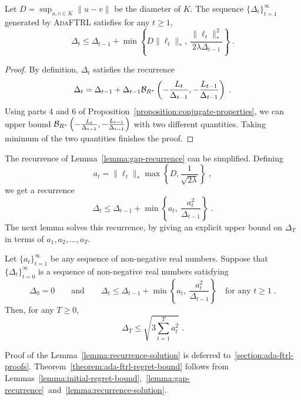 \begin{lemma}[Recurrence]
\label{lemma:gap-recurrence}
Let $D = \sup_{u, v \in K} \|u -v\|$ be the diameter of $K$.  The sequence
$\{\Delta_t\}_{t=1}^\infty$ generated by \textsc{AdaFTRL} satisfies for any $t
\ge 1$,
$$
\Delta_t \le \Delta_{t-1} + \min \left\{ D\|\ell_t\|_*, \ \frac{\|\ell_t\|_*^2}{2\lambda \Delta_{t-1}} \right\} \; .
$$
\end{lemma}

\begin{proof}
By definition, $\Delta_t$ satisfies the recurrence
$$
\Delta_t = \Delta_{t-1} + \Delta_{t-1} \mathcal{B}_{R^*}\left( - \frac{L_t}{\Delta_{t-1}}, - \frac{L_{t-1}}{\Delta_{t-1}} \right) \; .
$$
Using parts 4 and 6 of Proposition~\ref{proposition:conjugate-properties}, we
can upper bound $\mathcal{B}_{R^*}\left( - \frac{L_t}{\Delta_{t-1}}, -
\frac{L_{t-1}}{\Delta_{t-1}} \right)$ with two different quantities.  Taking
minimum of the two quantities finishes the proof.
\end{proof}

The recurrence of Lemma~\ref{lemma:gap-recurrence} can be simplified. Defining
$$
a_t = \|\ell_t\|_* \max \left\{D, \frac{1}{\sqrt{2 \lambda}} \right\} \; ,
$$
we get a recurrence
$$
\Delta_t \le \Delta_{t-1} + \min \left\{ a_t, \ \frac{a_t^2}{\Delta_{t-1}} \right\} \; .
$$
The next lemma solves this recurrence, by giving an explicit upper bound on
$\Delta_T$ in terms of $a_1, a_2, \dots, a_T$.

\begin{lemma}
\label{lemma:recurrence-solution}
Let $\{a_t\}_{t=1}^\infty$ be any sequence of non-negative real numbers.
Suppose that $\{\Delta_t\}_{t=0}^\infty$ is a sequence of non-negative real
numbers satisfying
$$
\Delta_0 = 0 \qquad \text{and} \qquad
\Delta_t \le \Delta_{t-1} + \min \left\{ a_t, \ \frac{a_t^2}{\Delta_{t-1}} \right\} \quad \text{for any $t \ge 1$} \; .
$$
Then, for any $T \ge 0$,
$$
\Delta_T \le \sqrt{3 \sum_{t=1}^T a_t^2} \; .
$$
\end{lemma}
%
Proof of the Lemma~\ref{lemma:recurrence-solution} is deferred
to~\ref{section:ada-ftrl-proofs}.  Theorem~\ref{theorem:ada-ftrl-regret-bound}
follows from
Lemmas~\ref{lemma:initial-regret-bound},~\ref{lemma:gap-recurrence}~and~\ref{lemma:recurrence-solution}.
